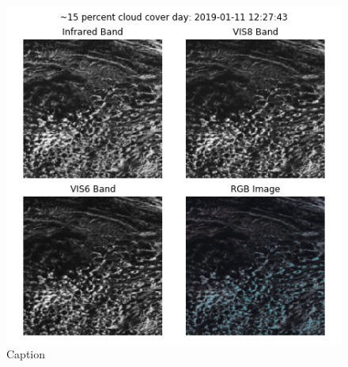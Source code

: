 \begin{figure}[H]
    \centering
    \includegraphics[totalheight=0.4\textheight]{15_per_day_sea_outlier.png}
    \caption{Caption}
    \label{fig:my_label}
\end{figure}


